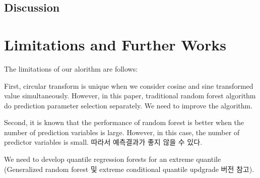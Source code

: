 \documentclass[11pt,titlepage]{article}
\begin{document}
	\subsection{Discussion}
	
	\section{Limitations and Further Works}
	
	The limitations of our alorithm are follows:
	
	First, circular transform is unique when we consider cosine and sine transformed value simultaneously. However, in this paper, traditional random forest algorithm do prediction parameter selection separately. We need to improve the algorithm.
	
	Second, it is known that the performance of random forest is better when the number of prediction variables is large. However, in this case, the number of predictor variables is small. 따라서 예측결과가 좋지 않을 수 있다.
	
	We need to develop quantile regression forests for an extreme quantile (Generalized random forest 및 extreme conditional quantile updgrade 버전 참고).

	
	
\end{document}
